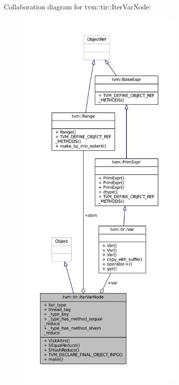 Collaboration diagram for tvm\+:\+:tir\+:\+:Iter\+Var\+Node\+:
\nopagebreak
\begin{figure}[H]
\begin{center}
\leavevmode
\includegraphics[height=550pt]{classtvm_1_1tir_1_1IterVarNode__coll__graph}
\end{center}
\end{figure}
